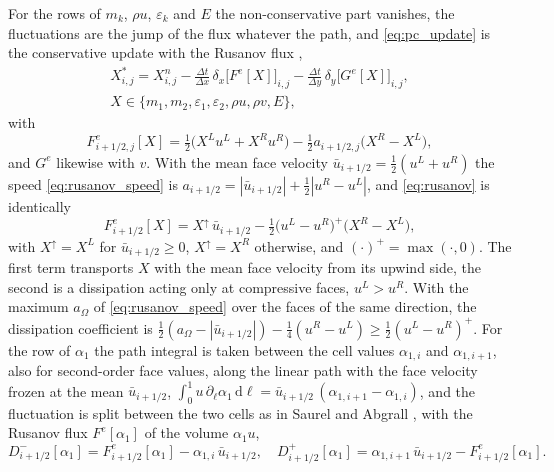 \documentclass[a4paper,fleqn]{cas-sc}
\begin{document}
For the rows of $m_k$, $\rho u$, $\varepsilon_k$ and $E$ the non-conservative part vanishes, the fluctuations are the jump of the flux
whatever the path, and \eqref{eq:pc_update} is the conservative update with the Rusanov flux
\cite{Rusanov1961},
\begin{equation}
\begin{gathered}
X^*_{i,j}=X^n_{i,j}-\frac{\Delta t}{\Delta x}\,\delta_x\big[F^e[X]\big]_{i,j}-\frac{\Delta t}{\Delta y}\,\delta_y\big[G^e[X]\big]_{i,j},\\
X\in\{m_1,m_2,\varepsilon_1,\varepsilon_2,\rho u,\rho v,E\},
\end{gathered}
\label{eq:explicit}
\end{equation}
with
\begin{equation}
F^e_{i+1/2,j}[X]=\tfrac12\big(X^Lu^L+X^Ru^R\big)-\tfrac12a_{i+1/2,j}\big(X^R-X^L\big),
\label{eq:rusanov}
\end{equation}
and $G^e$ likewise with $v$. With the mean face velocity $\bar u_{i+1/2}=\tfrac12(u^L+u^R)$ the speed \eqref{eq:rusanov_speed} is
$a_{i+1/2}=|\bar u_{i+1/2}|+\tfrac12|u^R-u^L|$, and \eqref{eq:rusanov} is identically
\begin{equation}
F^e_{i+1/2}[X]=X^{\uparrow}\,\bar u_{i+1/2}-\tfrac12\big(u^L-u^R\big)^+\big(X^R-X^L\big),
\label{eq:rusanov_upwind}
\end{equation}
with $X^\uparrow=X^L$ for $\bar u_{i+1/2}\ge0$, $X^\uparrow=X^R$ otherwise, and $(\cdot)^+=\max(\cdot,0)$. The first term transports $X$ with the mean face velocity
from its upwind side, the second is a dissipation acting only at compressive faces, $u^L>u^R$. With the maximum $a_\Omega$ of
\eqref{eq:rusanov_speed} over the faces of the same direction, the dissipation coefficient is
$\tfrac12(a_\Omega-|\bar u_{i+1/2}|)-\tfrac14(u^R-u^L)\ge\tfrac12(u^L-u^R)^+$.
For the row of $\alpha_1$ the path integral is taken between the cell values $\alpha_{1,i}$ and $\alpha_{1,i+1}$, also for second-order face
values, along the linear path with the face velocity frozen at the mean
$\bar u_{i+1/2}$, $\int_0^1u\,\partial_\ell\alpha_1\,\mathrm d\ell=\bar u_{i+1/2}\,(\alpha_{1,i+1}-\alpha_{1,i})$, and the fluctuation is split
between the two cells as in Saurel and Abgrall \cite{SaurelAbgrall1999a}, with the Rusanov flux $F^e[\alpha_1]$ of the volume
$\alpha_1u$,
\begin{equation}
D^-_{i+1/2}[\alpha_1]=F^e_{i+1/2}[\alpha_1]-\alpha_{1,i}\,\bar u_{i+1/2},\quad
D^+_{i+1/2}[\alpha_1]=\alpha_{1,i+1}\,\bar u_{i+1/2}-F^e_{i+1/2}[\alpha_1].
\label{eq:pc_rusanov}
\end{equation}
\end{document}
